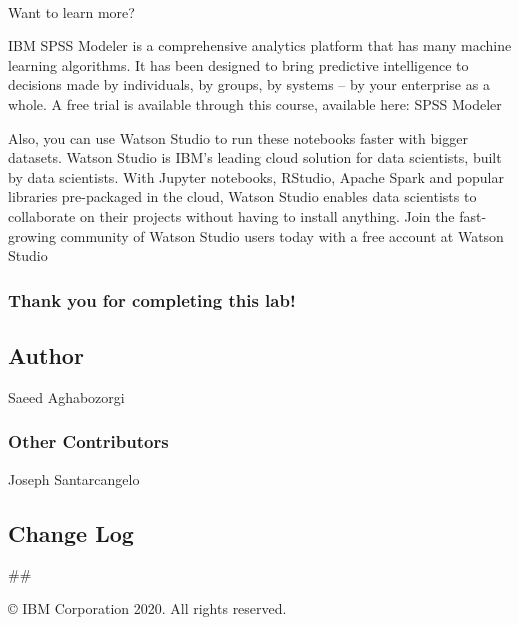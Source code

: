 \documentclass[11pt]{article}
\makeatletter
\newcommand{\boxspacing}{\kern\kvtcb@left@rule\kern\kvtcb@boxsep}
\newcommand{\prompt}[4]{
        {\ttfamily\llap{{\color{#2}[#3]:\hspace{3pt}#4}}\vspace{-\baselineskip}}
    }
\makeatother
\begin{document}
    \begin{center}
    \end{center}
    { \hspace*{\fill} \\}
    
    Want to learn more?

IBM SPSS Modeler is a comprehensive analytics platform that has many
machine learning algorithms. It has been designed to bring predictive
intelligence to decisions made by individuals, by groups, by systems --
by your enterprise as a whole. A free trial is available through this
course, available here: SPSS Modeler

Also, you can use Watson Studio to run these notebooks faster with
bigger datasets. Watson Studio is IBM's leading cloud solution for data
scientists, built by data scientists. With Jupyter notebooks, RStudio,
Apache Spark and popular libraries pre-packaged in the cloud, Watson
Studio enables data scientists to collaborate on their projects without
having to install anything. Join the fast-growing community of Watson
Studio users today with a free account at Watson Studio

    \hypertarget{thank-you-for-completing-this-lab}{%
\subsubsection{Thank you for completing this
lab!}\label{thank-you-for-completing-this-lab}}

\hypertarget{author}{%
\subsection{Author}\label{author}}

Saeed Aghabozorgi

\hypertarget{other-contributors}{%
\subsubsection{Other Contributors}\label{other-contributors}}

Joseph Santarcangelo

\hypertarget{change-log}{%
\subsection{Change Log}\label{change-log}}



\#\#

© IBM Corporation 2020. All rights reserved.

    \begin{tcolorbox}[breakable, size=fbox, boxrule=1pt, pad at break*=1mm,colback=cellbackground, colframe=cellborder]
\prompt{In}{incolor}{ }{\boxspacing}
\begin{Verbatim}[commandchars=\\\{\}]

\end{Verbatim}
\end{tcolorbox}


    
    
    
\end{document}
